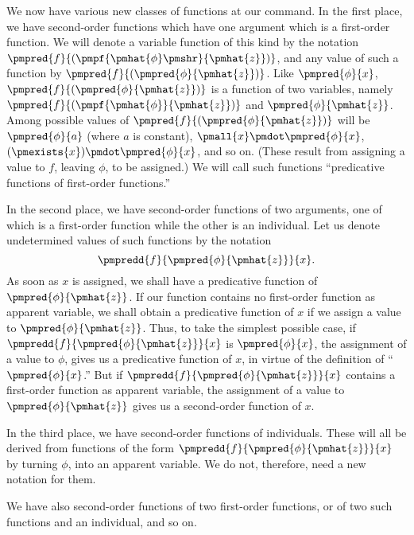 \documentclass[letterpaper,12pt,openany,leqno]{book}
\begin{document}
We now have various new classes of functions at our command. In the first place, we have second-order functions which have one argument which is a first-order function. We will denote a variable function of this kind by the notation $\pmpred{f}{(\pmpf{\pmhat{\phi}\pmshr}{\pmhat{z}})}$, and any value of such a function by $\pmpred{f}{(\pmpred{\phi}{\pmhat{z}})}$. Like $\pmpred{\phi}{x}$, $\pmpred{f}{(\pmpred{\phi}{\pmhat{z}})}$ is a function of two variables, namely $\pmpred{f}{(\pmpf{\pmhat{\phi}}{\pmhat{z}})}$ and $\pmpred{\phi}{\pmhat{z}}$. Among possible values of $\pmpred{f}{(\pmpred{\phi}{\pmhat{z}})}$ will be $\pmpred{\phi}{a}$ (where $a$ is constant), $\pmall{x}\pmdot \pmpred{\phi}{x}$, $(\pmexists{x})\pmdot \pmpred{\phi}{x}$, and so on. (These result from assigning a value to $f$, leaving $\phi$, to be assigned.) We will call such functions ``predicative functions of first-order functions.''

In the second place, we have second-order functions of two arguments, one of which is a first-order function while the other is an individual. Let us denote undetermined values of such functions by the notation
\[
	\pmpredd{f}{\pmpred{\phi}{\pmhat{z}}}{x}.
\]
As soon as $x$ is assigned, we shall have a predicative function of $\pmpred{\phi}{\pmhat{z}}$. If our function contains no first-order function as apparent variable, we shall obtain a predicative function of $x$ if we assign a value to $\pmpred{\phi}{\pmhat{z}}$. Thus, to take the simplest possible case, if $\pmpredd{f}{\pmpred{\phi}{\pmhat{z}}}{x}$ is $\pmpred{\phi}{x}$, the assignment of a value to $\phi$, gives us a predicative function of $x$, in virtue of the definition of ``$\pmpred{\phi}{x}$.'' But if $\pmpredd{f}{\pmpred{\phi}{\pmhat{z}}}{x}$ contains a first-order function as apparent variable, the assignment of a value to $\pmpred{\phi}{\pmhat{z}}$ gives us a second-order function of $x$.

In the third place, we have second-order functions of individuals. These will all be derived from functions of the form $\pmpredd{f}{\pmpred{\phi}{\pmhat{z}}}{x}$ by turning $\phi$, into an apparent variable. We do not, therefore, need a new notation for them.

We have also second-order functions of two first-order functions, or of two such functions and an individual, and so on.
\end{document}

